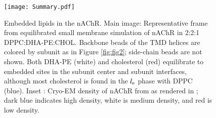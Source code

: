

	\begin{figure}[h!]
		\center
		\texttt{[image: Summary.pdf]}
		\caption{ Embedded lipids in the nAChR. Main image: Representative frame from equilibrated small membrane simulation of nAChR in 2:2:1 DPPC:DHA-PE:CHOL. Backbone beads of the TMD helices are colored by subunit as in Figure \ref{fig:fig2}; side-chain beads are not shown.  Both DHA-PE (white) and cholesterol (red) equilibrate to embedded sites in the subunit center and subunit interfaces, although most cholesterol is found in the $l_{\mathrm{o}}$ phase with DPPC (blue). Inset : Cryo-EM density of nAChR from \cite{Miyazawa2003} as rendered in \cite{Brannigan_Embedded_2008}; dark blue indicates high density, white is medium density, and red is low density. } 
		\label{fig:sum}
	\end{figure}

	 
